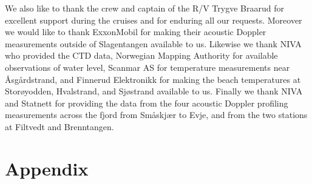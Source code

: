 \documentclass[12pt,a4paper,english]{article}
\begin{document}
We also like to thank the crew and captain of the R/V Trygve Braarud for excellent support during the cruises and for enduring all our requests. Moreover we would like to thank ExxonMobil for making their acoustic Doppler measurements outside of Slagentangen available to us. Likewise we thank NIVA who provided the CTD data, Norwegian Mapping Authority for available observations of water level, Scanmar AS for temperature measurements near {\AA}sg{\aa}rdstrand, and Finnerud Elektronikk for making the beach temperatures at Stor{\o}yodden, Hvalstrand, and Sj{\o}strand available to us. Finally we thank NIVA and Statnett for providing the data from the four acoustic Doppler profiling measurements across the fjord from Sm{\aa}skj{\ae}r to Evje, and from the two stations at Filtvedt and Brenntangen. 

\clearpage
\section*{\hspace{17mm}Appendix}





\clearpage
\pagebreak
{}



\clearpage
\pagebreak


 
\end{document}
